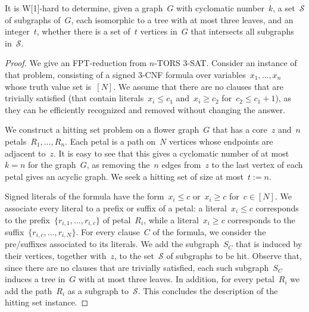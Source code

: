 \let\accentvec\vec  \documentclass{llncs}
\renewcommand{\S}{\ensuremath{\mathcal{S}}\xspace}
\newcommand{\nTORSThreeSat}{\textsc{$n$-TORS 3-SAT}\xspace}
\begin{document}
\begin{theorem} \label{theorem:hitclaws:whard}
It is W[1]-hard to determine, given a graph~$G$ with cyclomatic number~$k$, a set~$\S$ of subgraphs of~$G$, each isomorphic to a tree with at most three leaves, and an integer~$t$, whether there is a set of~$t$ vertices in~$G$ that intersects all subgraphs in~$\S$.
\end{theorem}
\begin{proof}
We give an FPT-reduction from \nTORSThreeSat. Consider an instance of that problem, consisting of a signed 3-CNF formula over variables~$x_1, \ldots, x_n$ whose truth value set is~$[N]$. We assume that there are no clauses that are trivially satisfied (that contain literals~$x_i \leq c_1$ and~$x_i \geq c_2$ for~$c_2 \leq c_1 + 1$), as they can be efficiently recognized and removed without changing the answer.

We construct a hitting set problem on a flower graph~$G$ that has a core~$z$ and~$n$ petals~$R_1, \ldots, R_n$. Each petal is a path on~$N$ vertices whose endpoints are adjacent to~$z$. It is easy to see that this gives a cyclomatic number of at most~$k = n$ for the graph~$G$, as removing the~$n$ edges from~$z$ to the last vertex of each petal gives an acyclic graph. We seek a hitting set of size at most~$t := n$.

Signed literals of the formula have the form~$x_i \leq c$ or~$x_i \geq c$ for~$c \in [N]$. We associate every literal to a prefix or suffix of a petal: a literal~$x_i \leq c$ corresponds to the prefix~$\{r_{i,1}, \ldots, r_{i,c}\}$ of petal~$R_i$, while a literal~$x_i \geq c$ corresponds to the suffix~$\{r_{i,c}, \ldots, r_{i,N}\}$. For every clause~$C$ of the formula, we consider the pre/suffixes associated to its literals. We add the subgraph~$S_C$ that is induced by their vertices, together with~$z$, to the set~$\S$ of subgraphs to be hit. Observe that, since there are no clauses that are trivially satisfied, each such subgraph~$S_C$ induces a tree in~$G$ with at most three leaves. In addition, for every petal~$R_i$ we add the path~$R_i$ as a subgraph to~$\S$. This concludes the description of the hitting set instance.


\end{proof}
\end{document}
